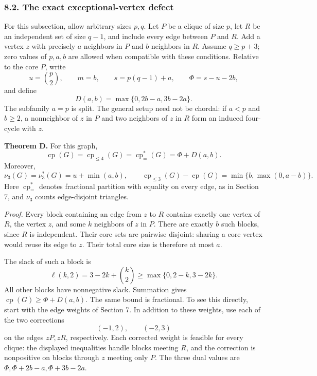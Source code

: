 \documentclass[english,11pt,a4paper]{article}
\begin{document}
\subsubsection{8.2. The exact exceptional-vertex
defect}\label{the-exact-exceptional-vertex-defect}

For this subsection, allow arbitrary sizes \(p,q\). Let \(P\) be a
clique of size \(p\), let \(R\) be an independent set of size \(q-1\),
and include every edge between \(P\) and \(R\). Add a vertex \(z\) with
precisely \(a\) neighbors in \(P\) and \(b\) neighbors in \(R\). Assume
\(q\ge p+3\); zero values of \(p,a,b\) are allowed when compatible with
these conditions. Relative to the core \(P\), write \[
u=\binom p2,\qquad m=b,\qquad s=p(q-1)+a,\qquad \Phi=s-u-2b,
\] and define \[
D(a,b)=\max\{0,2b-a,3b-2a\}.
\] The subfamily \(a=p\) is split. The general setup need not be
chordal: if \(a<p\) and \(b\ge2\), a nonneighbor of \(z\) in \(P\) and
two neighbors of \(z\) in \(R\) form an induced four-cycle with \(z\).

\textbf{Theorem D.} For this graph, \[
\operatorname{cp}(G)=\operatorname{cp}_{\le4}(G)
=\operatorname{cp}^{*}_{=}(G)=\Phi+D(a,b).
\] Moreover, \[
\nu_3(G)=\nu_3^*(G)=u+\min(a,b),\qquad
\operatorname{cp}_{\le3}(G)-\operatorname{cp}(G)
=\min\{b,\max(0,a-b)\}.
\] Here \(\operatorname{cp}^{*}_{=}\) denotes fractional partition with
equality on every edge, as in Section 7, and \(\nu_3\) counts
edge-disjoint triangles.

\emph{Proof.} Every block containing an edge from \(z\) to \(R\)
contains exactly one vertex of \(R\), the vertex \(z\), and some \(k\)
neighbors of \(z\) in \(P\). There are exactly \(b\) such blocks, since
\(R\) is independent. Their core sets are pairwise disjoint: sharing a
core vertex would reuse its edge to \(z\). Their total core size is
therefore at most \(a\).

The slack of such a block is \[
\ell(k,2)=3-2k+\binom k2\ge\max\{0,2-k,3-2k\}.
\] All other blocks have nonnegative slack. Summation gives
\(\operatorname{cp}(G)\ge\Phi+D(a,b)\). The same bound is fractional. To
see this directly, start with the edge weights of Section 7. In addition
to these weights, use each of the two corrections \[
(-1,2),\qquad (-2,3)
\] on the edges \(zP,zR\), respectively. Each corrected weight is
feasible for every clique: the displayed inequalities handle blocks
meeting \(R\), and the correction is nonpositive on blocks through \(z\)
meeting only \(P\). The three dual values are
\(\Phi,\Phi+2b-a,\Phi+3b-2a\).
\end{document}
